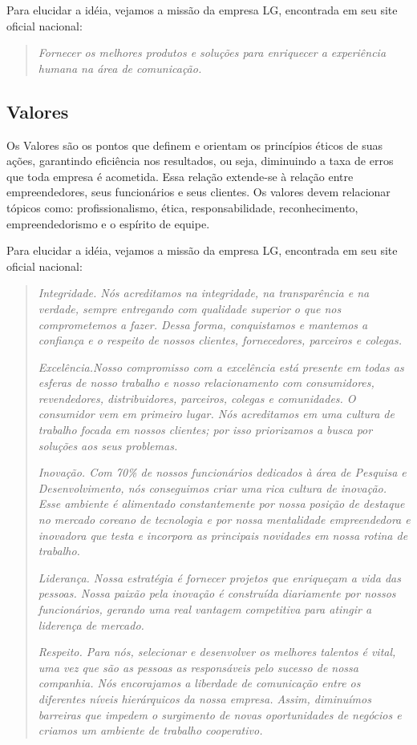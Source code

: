 \documentclass[12pt,a4paper]{article}
\begin{document}
Para elucidar a idéia, vejamos a missão da empresa LG, encontrada em seu site oficial nacional:

\begin{quote}
\textit{Fornecer os melhores produtos e soluções para enriquecer a experiência humana na área de comunicação.}
\end{quote} 

\subsection{Valores}

Os Valores são os pontos que definem e orientam os princípios éticos de suas ações, garantindo eficiência nos resultados, ou seja, diminuindo a taxa de erros que toda empresa é acometida. Essa relação extende-se à relação entre empreendedores, seus funcionários e seus clientes. Os valores devem relacionar tópicos como: profissionalismo, ética, responsabilidade, reconhecimento, empreendedorismo e o espírito de equipe.

Para elucidar a idéia, vejamos a missão da empresa LG, encontrada em seu site oficial nacional:

\begin{quote}
\textit{Integridade. Nós acreditamos na integridade, na transparência e na verdade, sempre entregando com qualidade superior o que nos comprometemos a fazer. Dessa forma, conquistamos e mantemos a confiança e o respeito de nossos clientes, fornecedores, parceiros e colegas.}

\textit{Excelência.Nosso compromisso com a excelência está presente em todas as esferas de nosso trabalho e nosso relacionamento com consumidores, revendedores, distribuidores, parceiros, colegas e comunidades. O consumidor vem em primeiro lugar. Nós acreditamos em uma cultura de trabalho focada em nossos clientes; por isso priorizamos a busca por soluções aos seus problemas.}

\textit{Inovação. Com 70\% de nossos funcionários dedicados à área de Pesquisa e Desenvolvimento, nós conseguimos criar uma rica cultura de inovação. Esse ambiente é alimentado constantemente por nossa posição de destaque no mercado coreano de tecnologia e por nossa mentalidade empreendedora e inovadora que testa e incorpora as principais novidades em nossa rotina de trabalho.}

\textit{Liderança. Nossa estratégia é fornecer projetos que enriqueçam a vida das pessoas. Nossa paixão pela inovação é construída diariamente por nossos funcionários, gerando uma real vantagem competitiva para atingir a liderença de mercado.}

\textit{Respeito. Para nós, selecionar e desenvolver os melhores talentos é vital, uma vez que são as pessoas as responsáveis pelo sucesso de nossa companhia. Nós encorajamos a liberdade de comunicação entre os diferentes níveis hierárquicos da nossa empresa. Assim, diminuímos barreiras que impedem o surgimento de novas oportunidades de negócios e criamos um ambiente de trabalho cooperativo.}
\end{quote} 
\end{document}
